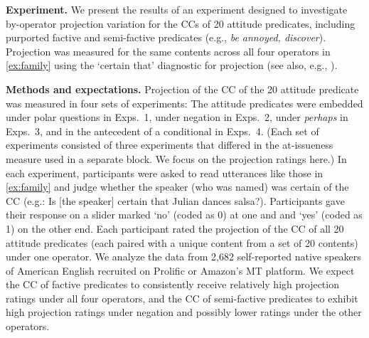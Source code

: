 \documentclass[12pt, a4paper]{scrartcl}
\begin{document}
\noindent
{\bf Experiment.} We present the results of an experiment designed to investigate by-operator projection variation for the CCs of 20 attitude predicates, including purported factive and semi-factive predicates (e.g., \emph{be annoyed, discover}). Projection was measured for the same contents across all four operators in \ref{ex:family} using the `certain that' diagnostic for projection (see also, e.g., \citealt{tonhauser_how_2018, djaerv-bacovcin-salt27, mahler2020}). 



\noindent
{\bf Methods and expectations.} Projection of the CC of the 20 attitude predicate was measured in four sets of experiments: The attitude predicates were embedded under polar questions in Exps.~1, under negation in Exps.~2, under {\em perhaps} in Exps.~3, and in the antecedent of a conditional in Exps.~4. (Each set of experiments consisted of three experiments that differed in the at-issueness measure used in a separate block. We focus on the projection ratings here.) In each experiment, participants were asked to read utterances like those in \ref{ex:family} and judge whether the speaker (who was named) was certain of the CC (e.g.: Is [the speaker] certain that Julian dances salsa?). Participants gave their response on a slider marked `no' (coded as 0) at one and and `yes' (coded as 1) on the other end. Each participant rated the projection of the CC of all 20 attitude predicates (each paired with a unique content from a set of 20 contents) under one operator. We analyze the data from 2,682 self-reported native speakers of American English recruited on Prolific or Amazon's MT platform. We expect the CC of factive predicates to consistently receive relatively high projection ratings under all four operators, and the CC of semi-factive predicates to exhibit high projection ratings under negation and possibly lower ratings under the other operators.
\end{document}
